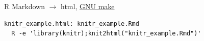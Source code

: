 \documentclass[12pt,t]{beamer}
\begin{document}
\begin{frame}[fragile]{R Markdown $\rightarrow$ html,
    \href{http://www.gnu.org/software/make}{GNU make}}

\vspace{24pt}

\begin{lstlisting}
knitr_example.html: knitr_example.Rmd
  R -e 'library(knitr);knit2html("knitr_example.Rmd")'
\end{lstlisting}

\end{frame}
\end{document}
